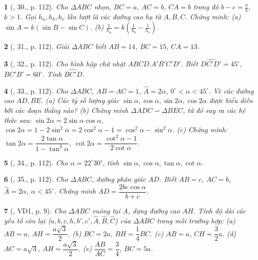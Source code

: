 \documentclass{article}
\newtheorem{baitoan}{}
\begin{document}
\begin{baitoan}[\cite{Tuyen_Toan_9_old}, 30., p. 112]
	Cho $\Delta ABC$ nhọn, $BC = a$, $AC = b$, $CA = b$ trong đó $b - c = \frac{a}{k}$, $k > 1$. Gọi $h_a,h_b,h_c$ lần lượt là các đường cao hạ từ $A,B,C$. Chứng minh: (a) $\sin A = k(\sin B - \sin C)$. (b) $\frac{1}{h_a} = k\left(\frac{1}{h_b} - \frac{1}{h_c}\right)$.
\end{baitoan}

\begin{baitoan}[\cite{Tuyen_Toan_9_old}, 31., p. 112]
	Giải $\Delta ABC$ biết $AB = 14$, $BC = 15$, $CA = 13$.
\end{baitoan}

\begin{baitoan}[\cite{Tuyen_Toan_9_old}, 32., p. 112]
	Cho hình hộp chữ nhật $ABCD.A'B'C'D'$. Biết $\widehat{DC'D'} = 45^\circ$, $\widehat{BC'B'} = 60^\circ$. Tính $\widehat{BC'D}$.
\end{baitoan}

\begin{baitoan}[\cite{Tuyen_Toan_9_old}, 33., p. 112]
	Cho $\Delta ABC$, $AB = AC = 1$, $\widehat{A} = 2\alpha$, $0^\circ < \alpha < 45^\circ$. Vẽ các đường cao $AD,BE$. (a) Các tỷ số lượng giác $\sin\alpha,\cos\alpha,\sin2\alpha,\cos2\alpha$ được biểu diễn bởi các đoạn thẳng nào? (b) Chứng minh $\Delta ADC\backsim\Delta BEC$, từ đó suy ra các hệ thức sau: $\sin2\alpha = 2\sin\alpha\cos\alpha$, $\cos2\alpha = 1 - 2\sin^2\alpha = 2\cos^2\alpha - 1 = \cos^2\alpha - \sin^2\alpha$. (c) Chứng minh: $\tan2\alpha = \dfrac{2\tan\alpha}{1 - \tan^2\alpha}$, $\cot2\alpha = \dfrac{\cot^2\alpha - 1}{2\cot\alpha}$.
\end{baitoan}

\begin{baitoan}[\cite{Tuyen_Toan_9_old}, 34., p. 112]
	Cho $\alpha = 22^\circ30'$, tính $\sin\alpha,\cos\alpha,\tan\alpha,\cot\alpha$.
\end{baitoan}

\begin{baitoan}[\cite{Tuyen_Toan_9_old}, 35., p. 112]
	Cho $\Delta ABC$, đường phân giác $AD$. Biết $AB = c$, $AC = b$, $\widehat{A} = 2\alpha$, $\alpha < 45^\circ$. Chứng minh $AD = \dfrac{2bc\cos\alpha}{b + c}$.
\end{baitoan}

\begin{baitoan}[\cite{Kien_hinh_hoc_9}, VD1, p. 9]
	Cho $\Delta ABC$ vuông tại A, dựng đường cao $AH$. Tính độ dài các yếu tố còn lại ($a,b,c,h,b',c',\widehat{A},\widehat{B},\widehat{C}$) của $\Delta ABC$ trong mỗi trường hợp: (a) $AB = a$, $AH = \dfrac{a\sqrt{3}}{2}$. (b) $BC = 2a$, $BH = \dfrac{1}{4}BC$. (c) $AB = a$, $CH = \dfrac{3}{2}a$. (d) $AC = a\sqrt{3}$, $AH = \dfrac{a\sqrt{3}}{2}$. (e) $\dfrac{AB}{AC} = \dfrac{3}{4}$, $BC = 5a$.
\end{baitoan}
\end{document}
